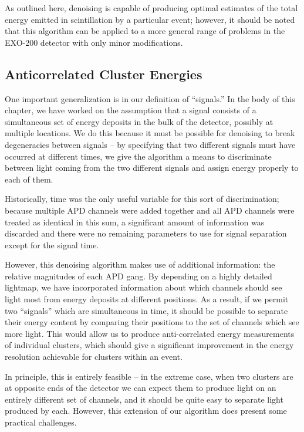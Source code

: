As outlined here, denoising is capable of producing optimal estimates of the total energy emitted in scintillation by a particular event; however, it should be noted that this algorithm can be applied to a more general range of problems in the EXO-200 detector with only minor modifications.

\subsection{Anticorrelated Cluster Energies}

One important generalization is in our definition of ``signals.''  In the body of this chapter, we have worked on the assumption that a signal consists of a simultaneous set of energy deposits in the bulk of the detector, possibly at multiple locations.  We do this because it must be possible for denoising to break degeneracies between signals -- by specifying that two different signals must have occurred at different times, we give the algorithm a means to discriminate between light coming from the two different signals and assign energy properly to each of them.

Historically, time was the only useful variable for this sort of discrimination; because multiple APD channels were added together and all APD channels were treated as identical in this sum, a significant amount of information was discarded and there were no remaining parameters to use for signal separation except for the signal time.

However, this denoising algorithm makes use of additional information: the relative magnitudes of each APD gang.  By depending on a highly detailed lightmap, we have incorporated information about which channels should see light most from energy deposits at different positions.   As a result, if we permit two ``signals'' which are simultaneous in time, it should be possible to separate their energy content by comparing their positions to the set of channels which see more light.  This would allow us to produce anti-correlated energy measurements of individual clusters, which should give a significant improvement in the energy resolution achievable for clusters within an event.

In principle, this is entirely feasible -- in the extreme case, when two clusters are at opposite ends of the detector we can expect them to produce light on an entirely different set of channels, and it should be quite easy to separate light produced by each.  However, this extension of our algorithm does present some practical challenges.

